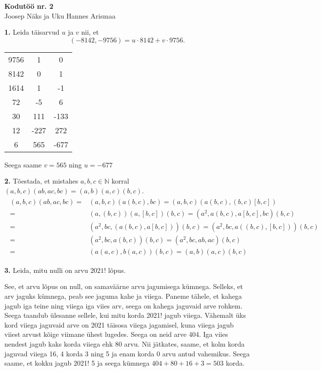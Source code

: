 \documentclass[a4paper, 10pt]{article}
\begin{document}
\begin{center}
\Large\textbf{Kodutöö nr. 2}\\
\small{Joosep Näks ja Uku Hannes Arismaa}
\end{center}
\noindent \textbf{1.} Leida täisarvud $u$ ja $v$ nii, et $$(-8142,-9756)=u\cdot 8142+v\cdot 9756.$$

\smallskip
\begin{center}
\begin{tabular}{ |c|c|c| } 
 \hline
 9756 & 1 & 0 \\ 
 8142 & 0 & 1 \\ 
 1614 & 1 & -1 \\ 
 72&-5&6\\
 30&111&-133\\
 12&-227&272\\
 6&565&-677\\
 \hline
\end{tabular}
\end{center}
Seega saame $v=565$ ning $u=-677$
\bigskip

\bigskip
\noindent\textbf{2.} Tõestada, et mistahes $a,b,c\in\mathbb{N}$ korral $(a,b,c)(ab,ac,bc)=(a,b)(a,c)(b,c)$.
\begin{gather*}
\begin{aligned}
(a,b,c)(ab,ac,bc)=&(a,b,c)(a(b,c),bc)=(a,b,c)(a(b,c),(b,c)[b,c])\\
=&(a,(b,c))(a,[b,c])(b,c)=(a^2,a(b,c),a[b,c],bc)(b,c)\\
=&(a^2,bc,(a(b,c),a[b,c]))(b,c)=(a^2,bc,a((b,c),[b,c]))(b,c)\\
=&(a^2,bc,a(b,c))(b,c)=(a^2,bc,ab,ac)(b,c)\\
=&(a(a,c),b(a,c))(b,c)=(a,b)(a,c)(b,c)
\end{aligned}
\end{gather*}
\bigskip

\noindent \textbf{3.} Leida, mitu nulli on arvu $2021!$ lõpus.

\bigskip
See, et arvu lõpus on null, on samaväärne arvu jagumisega kümnega. Selleks, et arv jaguks kümnega, peab see jaguma kahe ja viiega. Paneme tähele, et kahega jagub iga teine ning viiega iga viies arv, seega on kahega jaguvaid arve rohkem. Seega taandub ülesanne sellele, kui mitu korda 2021! jagub viiega. Vähemalt üks kord viiega jaguvaid arve on 2021 täisosa viiega jagamisel, kuna viiega jagub viiest arvust kõige viimane ühest lugedes. Seega on neid arve 404. Iga viies nendest jagub kaks korda viiega ehk 80 arvu. Nii jätkates, saame, et kolm korda jaguvad viiega 16, 4 korda 3 ning 5 ja enam korda 0 arvu antud vahemikus. Seega saame, et kokku jagub 2021! 5 ja seega kümnega $404+80+16+3=503$ korda.
\bigskip
\end{document}
